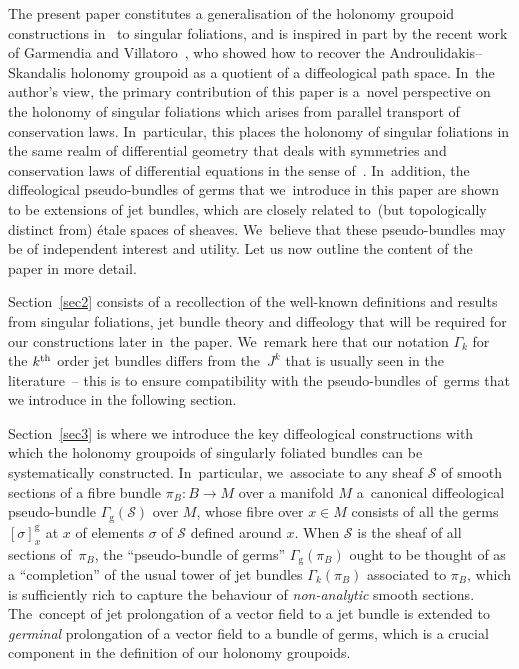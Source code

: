 \documentclass[10pt,a4paper]{amsart}
\numberwithin{equation}{section}
\def\g{\operatorname{g}}
\def\SS{{\mathscr{S}}}
\begin{document}
The present paper constitutes a generalisation of the holonomy groupoid constructions in~\cite{mac3} to singular foliations, and is inspired in part by the recent work of Garmendia and Villatoro~\cite{VilGar1}, who showed how to recover the Androulidakis--Skandalis holonomy groupoid as a quotient of a diffeological path space. In~the author's view, the primary contribution of this paper is a~novel perspective on the holonomy of singular foliations which arises from parallel transport of conservation laws. In~particular, this places the holonomy of singular foliations in the same realm of differential geometry that deals with symmetries and conservation laws of differential equations in the sense of~\cite{varbi,olver}. In~addition, the diffeological pseudo-bundles of germs that we~introduce in this paper are shown to be extensions of jet bundles, which are closely related to~(but topologically distinct from) \'{e}tale spaces of sheaves. We~believe that these pseudo-bundles may be of independent interest and utility. Let us now outline the content of the paper in more detail.

Section~\ref{sec2} consists of a recollection of the well-known definitions and results from singular foliations, jet bundle theory and diffeology that will be required for our constructions later in~the paper. We~remark here that our notation $\Gamma_{k}$ for the $k^{\rm th}$ order jet bundles differs from the~$J^{k}$ that is usually seen in the literature~-- this is to ensure compatibility with the pseudo-bundles of~germs that we introduce in the following section.

Section~\ref{sec3} is where we introduce the key diffeological constructions with which the holonomy groupoids of singularly foliated bundles can be systematically constructed. In~particular, we~asso\-ciate to any sheaf $\SS$ of smooth sections of a fibre bundle $\pi_{B}\colon B\rightarrow M$ over a manifold $M$ a~cano\-nical diffeological pseudo-bundle $\Gamma_{\g}(\SS)$ over $M$, whose fibre over $x\in M$ consists of all the germs $[\sigma]^{\g}_{x}$ at $x$ of elements $\sigma$ of $\SS$ defined around $x$. When $\SS$ is the sheaf of all sections of~$\pi_{B}$, the ``pseudo-bundle of germs'' $\Gamma_{\g}(\pi_{B})$ ought to be thought of as a ``completion'' of the usual tower of jet bundles $\Gamma_{k}(\pi_{B})$ associated to $\pi_{B}$, which is sufficiently rich to capture the behaviour of \textit{non-analytic} smooth sections. The~concept of jet prolongation of a vector field to a jet bundle is extended to \textit{germinal} prolongation of a vector field to a bundle of germs, which is a crucial component in the definition of our holonomy groupoids.
\end{document}
